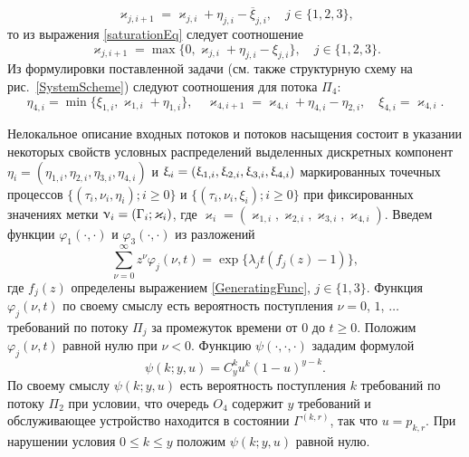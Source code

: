 \begin{equation*}
\varkappa_{j,  i+1}=\varkappa_{j,  i}+\eta_{j,  i}-\overline{\xi}_{j,  i},  \quad  j \in \{1,  2,  3\}, 
\end{equation*}
то из выражения \eqref{saturationEq} следует соотношение
\begin{equation}
\varkappa_{j,  i+1}=\max\{{0,  \varkappa_{j,  i}+\eta_{j,  i}-\xi_{j,  i}}\},  \quad j \in \{1,  2,  3\}.
\label{queuesFunc}
\end{equation}
Из формулировки поставленной задачи (см. также структурную схему на рис.~\ref{SystemScheme}) следуют соотношения для потока $\Pi_4$:
\begin{equation}
\eta_{4, i} = \min\{\xi_{1, i},  \varkappa_{1, i}+\eta_{1, i}\},  \quad \varkappa_{4, i+1}=\varkappa_{4, i}+\eta_{4, i}-\eta_{2, i},  \quad \xi_{4, i} = \varkappa_{4, i}.
\label{FourthFunc}
\end{equation}

Нелокальное описание входных потоков и потоков насыщения состоит в указании некоторых свойств условных распределений выделенных дискретных компонент $\eta_i=(\eta_{1,  i},  \eta_{2,  i},  \eta_{3,  i},  \eta_{4,  i})$ и $\xi_i \hm{=} (\xi_{1,  i},  \xi_{2,  i},  \xi_{3,  i},  \xi_{4,  i})$ маркированных точечных процессов  $\{(\tau_i,  \nu_i,  \eta_i); i\geqslant 0\}$ и $\{(\tau_i,  \nu_i,  \xi_i); i\geqslant 0\}$ при фиксированных значениях метки $\nu_i \hm= (\Gamma_i; \varkappa_i)$,  где $\varkappa_i=(\varkappa_{1,  i},  \varkappa_{2,  i},  \varkappa_{3,  i},  \varkappa_{4,  i})$. 
Введем функции $\varphi_1(\cdot,  \cdot)$ и $\varphi_3(\cdot,  \cdot)$ из разложений 
\begin{equation*}
\sum_{\nu=0}^{\infty} z^\nu\varphi_j(\nu,  t) = \exp\{\lambda_j t (f_j(z)-1)\}, 
\end{equation*}
где $f_j(z)$ определены выражением \eqref{GeneratingFunc},  $j \in \{1, 3\}$. Функция $\varphi_j(\nu,  t)$ по своему смыслу есть вероятность поступления $\nu=0$,  $1$,  $\ldots$ требований по потоку $\Pi_j$ за промежуток времени от $0$ до $t \geqslant 0$. Положим $\varphi_j(\nu, t)$ равной нулю при $\nu < 0$. Функцию $\psi(\cdot,  \cdot,  \cdot)$ зададим формулой
\begin{equation*}
\psi(k;y, u)=C_y^k u^k (1-u)^{y-k}.	
\end{equation*}
По своему смыслу $\psi(k; y,  u)$ есть вероятность поступления $k$ требований по потоку $\Pi_2$ при условии,  что очередь $O_4$ содержит $y$ требований и обслуживающее устройство находится в состоянии $\Gamma^{(k,  r)}$,  так что $u=p_{k,  r}$. При нарушении условия $ 0\leqslant k \leqslant y$ положим $\psi(k; y,  u)$ равной нулю.


